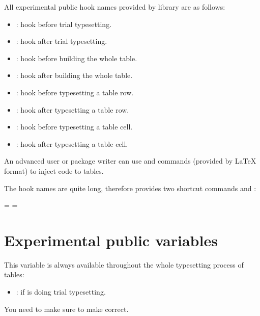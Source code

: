 \documentclass[oneside]{book}
\begin{document}
{All experimental public  hook names provided by  library are as follows:
\begin{itemize}[nosep]
  \item {}: hook before trial typesetting.
  \item {}: hook after trial typesetting.
  \item {}: hook before building the whole table.
  \item {}: hook after building the whole table.
  \item {}: hook before typesetting a table row.
  \item {}: hook after typesetting a table row.
  \item {}: hook before typesetting a table cell.
  \item {}: hook after typesetting a table cell.
\end{itemize}
An advanced user or package writer can use \CC{\AddToHook} and \CC{\AddToHookNext} commands
(provided by LaTeX format) to inject code to  tables.

The hook names are quite long, therefore  provides two shortcut commands
\CC{\AddToTblrHook} and \CC{\AddToTblrHookNext}:

\begin{codehigh}
 = 
 = 
\end{codehigh}

\section{Experimental public variables}
\label{sect:pubvar}

This variable is always available throughout the whole typesetting process of tables:
\begin{itemize}[nosep]
  \item \CC{\lTblrMeasuringBool}: if  is doing trial typesetting.
\end{itemize}
You need to make sure  to make \CC{\lTblrMeasuringBool} correct.

}
\end{document}
